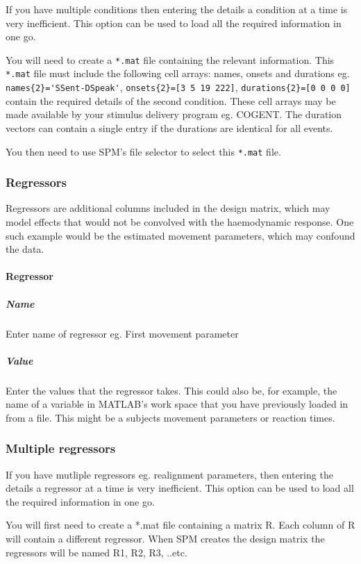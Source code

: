 If you have multiple conditions then entering the details a condition at a time is very inefficient. This option can be used to load all the required information in one go. 

You will need to create a \verb!*.mat! file containing the relevant information. This \verb!*.mat! file must include the following cell arrays: names, onsets and durations eg. \verb!names{2}='SSent-DSpeak'!, \verb!onsets{2}=[3 5 19 222]!, \verb!durations{2}=[0 0 0 0]! contain the required details of the second condition. These cell arrays may be made available by your stimulus delivery program eg. COGENT. The duration vectors can contain a single entry if the durations are identical for all events. 

You then need to use SPM's file selector to select this \verb!*.mat! file.

\subsubsection{Regressors}

Regressors are additional columns included in the design matrix, which may model effects that would not be convolved with the haemodynamic response.  One such example would be the estimated movement parameters, which may confound the data.

\paragraph{Regressor}

\subparagraph{Name}

Enter name of regressor eg. First movement parameter

\subparagraph{Value}

Enter the values that the regressor takes. This could also be, for example, the name of a variable in MATLAB's work space that you have previously loaded in from a file. This might be a subjects movement parameters or reaction times.

\subsubsection{Multiple regressors}

If you have mutliple regressors eg. realignment parameters, then entering the details a regressor at a time is very inefficient. This option can be used to load all the required information in one go. 

You will first need to create a *.mat file containing a matrix R. Each column of R will contain a different regressor. When SPM creates the design matrix the regressors will be named R1, R2, R3, ..etc.

